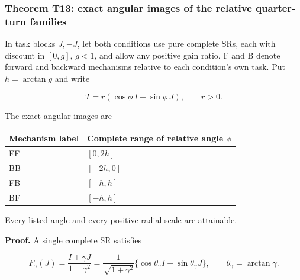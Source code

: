 \documentclass[11pt,a4paper]{article}
\begin{document}
\subsubsection{Theorem T13: exact angular images of the relative
quarter-turn
families}\label{theorem-t13-exact-angular-images-of-the-relative-quarter-turn-families}

\par
\noindent\begin{minipage}{\linewidth}

In task blocks \(J,-J\), let both conditions use pure complete SRs, each
with discount in \([0,g]\), \(g<1\), and allow any positive gain ratio.
F and B denote forward and backward mechanisms relative to each
condition's own task. Put \(h=\arctan g\) and write

\[
T=r(\cos\phi\,I+\sin\phi\,J),\qquad r>0.
\]

\end{minipage}\par

The exact angular images are


\begingroup
\small

\begin{longtable}[]{@{}ll@{}}
\toprule\noalign{}
Mechanism label & Complete range of relative angle \(\phi\) \\
\midrule\noalign{}
\endhead
\bottomrule\noalign{}
\endlastfoot
FF & \([0,2h]\) \\
BB & \([-2h,0]\) \\
FB & \([-h,h]\) \\
BF & \([-h,h]\) \\
\end{longtable}

\endgroup

Every listed angle and every positive radial scale are attainable.

\par
\noindent\begin{minipage}{\linewidth}

\textbf{Proof.} A single complete SR satisfies

\[
F_\gamma(J)=\frac{I+\gamma J}{1+\gamma^2}
=\frac1{\sqrt{1+\gamma^2}}
\{\cos\theta_\gamma I+\sin\theta_\gamma J\},
\qquad\theta_\gamma=\arctan\gamma.
\]

\end{minipage}\par
\end{document}
